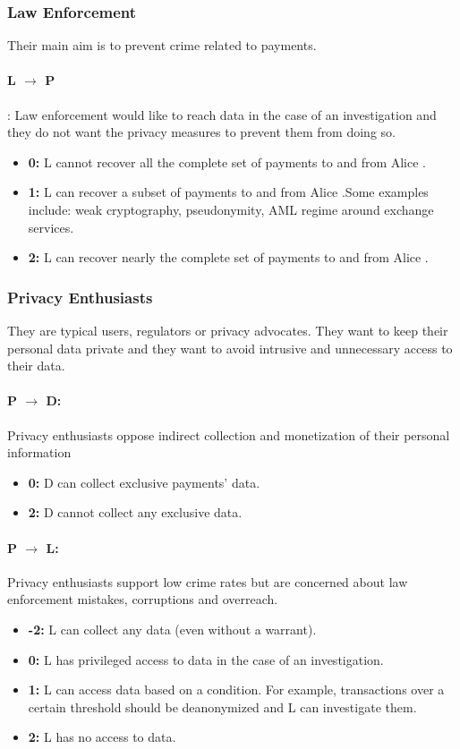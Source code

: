 \documentclass[runningheads]{llncs}
\begin{document}
 \subsubsection{Law Enforcement}
  Their main aim is to prevent crime related to payments. 
  \paragraph{L $\rightarrow$ P}: Law enforcement would like to reach data in the case of an investigation and they do not want the privacy measures to prevent them from doing so.
  
  \begin{itemize}
  	\item \textbf{0:} L cannot recover all the complete set of payments to and from Alice . 
  	\item \textbf{1:} L can recover  a subset of payments to and from Alice .Some examples include: weak cryptography, pseudonymity, AML regime around exchange services.
  	\item \textbf{2:} L can recover  nearly the complete set of payments to and from Alice . 
  \end{itemize}
  
  
 \subsubsection{Privacy Enthusiasts}
 They are typical users, regulators or privacy advocates. They want to keep their personal data private and they want to avoid intrusive and unnecessary access to their data.
 \paragraph{P $\rightarrow$ D:} Privacy enthusiasts oppose indirect collection and monetization of their personal information
 
   \begin{itemize}

 	\item \textbf{0:} D can collect exclusive payments' data. %
 	\item \textbf{2:} D cannot collect any exclusive data.
 \end{itemize}

\paragraph{P $\rightarrow$ L:} Privacy enthusiasts support low crime rates but are concerned about law enforcement mistakes, corruptions and overreach.
   \begin{itemize}
	\item \textbf{-2:} L can collect any data (even without a warrant).
	\item \textbf{0:}  L has privileged access to data in the case of an investigation.
	\item \textbf{1:} L can access data based on a condition. For example, transactions over a certain threshold should be deanonymized and L can investigate them.
	\item \textbf{2:} L has no access to data.
\end{itemize}
\end{document}
